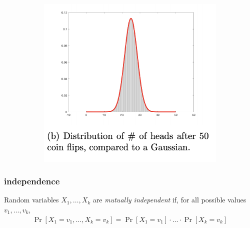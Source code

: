 \documentclass[handout,compress]{beamer}
\begin{document}
\begin{frame}
\begin{figure}
\begin{subfigure}[t]{0.4\textwidth}
			\end{subfigure}
			\hspace{4em}
			\begin{subfigure}[t]{0.4\textwidth}
				\centering
				\includegraphics[width=\textwidth]{cltSkinny.png}
			\end{subfigure}
		\end{figure}
\end{frame}

\begin{frame}
	\frametitle{independence}
	\begin{definition}
		Random variables $X_1, \ldots, X_k$ are \emph{mutually independent} if, for all possible values $v_1, \ldots, v_k$,
		\begin{align*}
			\Pr[X_1 = v_1, \ldots, X_k = v_k] = 	\Pr[X_1 = v_1]\cdot\ldots \cdot\Pr[X_k = v_k]
		\end{align*}
	\end{definition}
	\begin{center}
	\end{center}
\end{frame}
\end{document}
